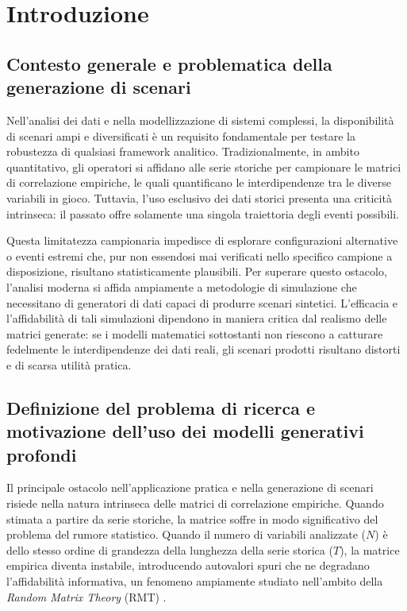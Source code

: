 \chapter{Introduzione}
\label{ch:introduzione}

\section{Contesto generale e problematica della generazione di scenari}

Nell'analisi dei dati e nella modellizzazione di sistemi complessi, la disponibilità di scenari ampi e diversificati è un requisito fondamentale per testare la robustezza di qualsiasi framework analitico. Tradizionalmente, in ambito quantitativo, gli operatori si affidano alle serie storiche per campionare le matrici di correlazione empiriche, le quali quantificano le interdipendenze tra le diverse variabili in gioco. Tuttavia, l'uso esclusivo dei dati storici presenta una criticità intrinseca: il passato offre solamente una singola traiettoria degli eventi possibili.

Questa limitatezza campionaria impedisce di esplorare configurazioni alternative o eventi estremi che, pur non essendosi mai verificati nello specifico campione a disposizione, risultano statisticamente plausibili. Per superare questo ostacolo, l'analisi moderna si affida ampiamente a metodologie di simulazione che necessitano di generatori di dati capaci di produrre scenari sintetici. L'efficacia e l'affidabilità di tali simulazioni dipendono in maniera critica dal realismo delle matrici generate: se i modelli matematici sottostanti non riescono a catturare fedelmente le interdipendenze dei dati reali, gli scenari prodotti risultano distorti e di scarsa utilità pratica.

\section{Definizione del problema di ricerca e motivazione dell'uso dei modelli generativi profondi}
\label{sec:problema_ricerca}

Il principale ostacolo nell'applicazione pratica e nella generazione di scenari risiede nella natura intrinseca delle matrici di correlazione empiriche. Quando stimata a partire da serie storiche, la matrice soffre in modo significativo del problema del rumore statistico. Quando il numero di variabili analizzate ($N$) è dello stesso ordine di grandezza della lunghezza della serie storica ($T$), la matrice empirica diventa instabile, introducendo autovalori spuri che ne degradano l'affidabilità informativa, un fenomeno ampiamente studiato nell'ambito della \emph{Random Matrix Theory} (RMT) \citep{bouchaud2009rmt, plerou2002randommatrix}.

